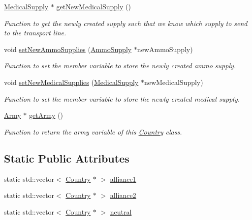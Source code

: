 \begin{DoxyCompactItemize}
\mbox{\hyperlink{class_medical_supply}{Medical\+Supply}} $\ast$ \mbox{\hyperlink{class_country_a1b51d2e6356a8368dd6ee7cbc21db0e4}{get\+New\+Medical\+Supply}} ()
\begin{DoxyCompactList}\small\item\em Function to get the newly created supply such that we know which supply to send to the transport line. \end{DoxyCompactList}\item 
void \mbox{\hyperlink{class_country_a39b4294819a0b5e2513d4093401ec6a7}{set\+New\+Ammo\+Supplies}} (\mbox{\hyperlink{class_ammo_supply}{Ammo\+Supply}} $\ast$new\+Ammo\+Supply)
\begin{DoxyCompactList}\small\item\em Function to set the member variable to store the newly created ammo supply. \end{DoxyCompactList}\item 
void \mbox{\hyperlink{class_country_a0db028ef78f6b28b925e504e8f017266}{set\+New\+Medical\+Supplies}} (\mbox{\hyperlink{class_medical_supply}{Medical\+Supply}} $\ast$new\+Medical\+Supply)
\begin{DoxyCompactList}\small\item\em Function to set the member variable to store the newly created medical supply. \end{DoxyCompactList}\item 
\mbox{\hyperlink{class_army}{Army}} $\ast$ \mbox{\hyperlink{class_country_a3959c7dc7ade25ff431098fffea6156a}{get\+Army}} ()
\begin{DoxyCompactList}\small\item\em Function to return the army variable of this \mbox{\hyperlink{class_country}{Country}} class. \end{DoxyCompactList}\end{DoxyCompactItemize}
\subsection*{Static Public Attributes}
\begin{DoxyCompactItemize}
\item 
static std\+::vector$<$ \mbox{\hyperlink{class_country}{Country}} $\ast$ $>$ \mbox{\hyperlink{class_country_aa31ffa895ce3842620c7a9b28078fa12}{alliance1}}
\item 
static std\+::vector$<$ \mbox{\hyperlink{class_country}{Country}} $\ast$ $>$ \mbox{\hyperlink{class_country_a068359e92bc21f41aa6404d3d25d1d7a}{alliance2}}
\item 
static std\+::vector$<$ \mbox{\hyperlink{class_country}{Country}} $\ast$ $>$ \mbox{\hyperlink{class_country_aa47868ab5f109c05a5f2d4be6df3f325}{neutral}}
\end{DoxyCompactItemize}
